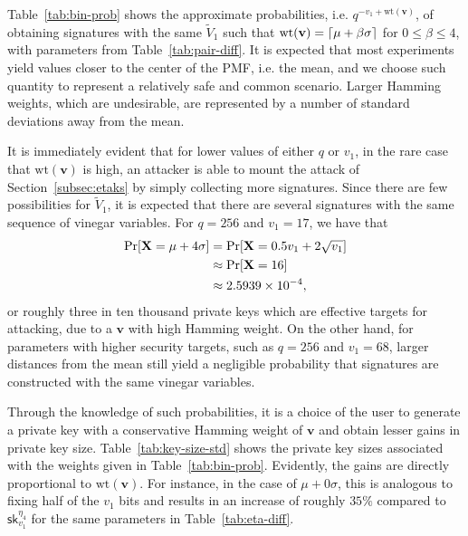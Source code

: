 \documentclass[12pt, a4paper, oneside]{memoir}
\DeclarePairedDelimiter{\ceil}{\lceil}{\rceil}
\theoremstyle{definition}
\begin{document}
Table~\ref{tab:bin-prob} shows the approximate probabilities, i.e. $q^{-v_{1} + \text{wt}(\mathbf{v})}$, of obtaining signatures with the same $\widetilde{V}_{1}$ such that $\text{wt}(\mathbf{v}) = \ceil{\mu + \beta \sigma}$ for $0 \leq \beta \leq 4$, with parameters from Table~\ref{tab:pair-diff}. It is expected that most experiments yield values closer to the center of the PMF, i.e. the mean, and we choose such quantity to represent a relatively safe and common scenario. Larger Hamming weights, which are undesirable, are represented by a number of standard deviations away from the mean.

It is immediately evident that for lower values of either $q$ or $v_{1}$, in the rare case that $\text{wt}(\mathbf{v})$ is high, an attacker is able to mount the attack of Section~\ref{subsec:etaks} by simply collecting more signatures. Since there are few possibilities for $\widetilde{V}_{1}$, it is expected that there are several signatures with the same sequence of vinegar variables. For $q = 256$ and $v_{1} = 17$, we have that
\begin{align}
  \begin{split}
    \Pr[\mathbf{X} = \mu + 4\sigma] 
      &= \Pr[\mathbf{X} = 0.5 v_{1} + 2 \sqrt{v_{1}}] \\
      &\approx \Pr[\mathbf{X} = 16] \\
      &\approx \num{2.5939E-4},
  \end{split}
\end{align}
or roughly three in ten thousand private keys which are effective targets for attacking, due to a $\mathbf{v}$ with high Hamming weight. On the other hand, for parameters with higher security targets, such as $q = 256$ and $v_{1} = 68$, larger distances from the mean still yield a negligible probability that signatures are constructed with the same vinegar variables.

Through the knowledge of such probabilities, it is a choice of the user to generate a private key with a conservative Hamming weight of $\mathbf{v}$ and obtain lesser gains in private key size. Table~\ref{tab:key-size-std} shows the private key sizes associated with the weights given in Table~\ref{tab:bin-prob}. Evidently, the gains are directly proportional to $\text{wt}(\mathbf{v})$. For instance, in the case of $\mu + 0\sigma$, this is analogous to fixing half of the $v_{1}$ bits and results in an increase of roughly $35\%$ compared to $\textsf{sk}^{\eta_{4}}_{v_{1}}$ for the same parameters in Table~\ref{tab:eta-diff}.
\end{document}
